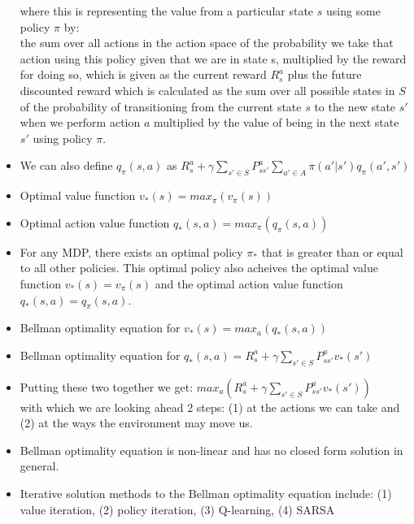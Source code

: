 \documentclass[12pt]{article}
\begin{document}
\begin{itemize}
    where this is representing the value from a particular state $s$ using some policy $\pi$ by: \\
    the sum over all actions in the action space of the probability we take that action using this policy
    given that we are in state s, multiplied by the reward for doing so, which is given as the current
    reward $R_s^a$ plus the future discounted reward which is calculated as the sum over all possible states
    in $S$ of the probability of transitioning from the current state $s$ to the new state $s'$ when we perform
    action $a$ multiplied by the value of being in the next state $s'$ using policy $\pi$.
    \item We can also define $q_\pi(s,a)$ as $R_s^a + \gamma \sum_{s' \in S}P_{ss'}^a \sum_{a' \in A} \pi(a' | s')q_\pi(a', s')$
    \item Optimal value function $v_*(s) = max_\pi(v_\pi(s))$
    \item Optimal action value function $q_*(s, a) = max_\pi(q_\pi(s, a))$
    \item For any MDP, there exists an optimal policy $\pi_*$ that is greater than or equal to all other policies. This optimal policy
    also acheives the optimal value function $v_*(s) = v_\pi(s)$ and the optimal action value function $q_*(s,a) = q_\pi(s,a)$.
    \item Bellman optimality equation for $v_*(s) = max_a(q_*(s, a))$
    \item Bellman optimality equation for $q_*(s, a) = R_s^a + \gamma \sum_{s' \in S}P_{ss'}^a v_*(s')$
    \item Putting these two together we get: $max_a(R_s^a + \gamma \sum_{s' \in S}P_{ss'}^a v_*(s'))$\\
    with which we are looking ahead 2 steps: (1) at the actions we can take and (2) at the ways the environment may move us.
    \item Bellman optimality equation is non-linear and has no closed form solution in general.
    \item Iterative solution methods to the Bellman optimality equation include: (1) value iteration, (2) policy iteration,
    (3) Q-learning, (4) SARSA
  \end{itemize}
\end{document}
